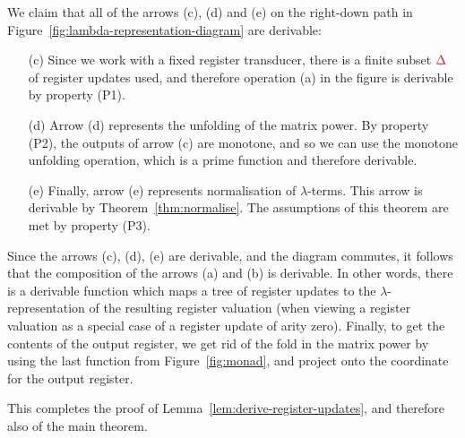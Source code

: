 \pagebreak 
We claim that all of the arrows (c), (d) and (e) on the  right-down path  in  Figure~\ref{fig:lambda-representation-diagram}  are derivable:
\begin{itemize}
    \item[(c)] Since we work with a fixed register transducer, there is a finite subset ${\color{red}{\Delta}}$ of register updates  used, and therefore  operation (a) in the figure is derivable by property (P1).
    \item[(d)] Arrow (d) represents the unfolding of the matrix power. By property (P2), the outputs of arrow (c) are monotone, and so we can use the monotone unfolding operation, which is a  prime function and therefore derivable. 
    \item[(e)] Finally, arrow (e) represents normalisation of $\lambda$-terms. This arrow is derivable by Theorem~\ref{thm:normalise}. The assumptions of this theorem are met by property (P3).
\end{itemize}
Since the arrows (c), (d), (e) are derivable, and the diagram commutes, it follows that  the composition of the arrows (a) and (b) is derivable. In other words, there is a derivable function which maps a tree of register updates to the $\lambda$-representation of the resulting register valuation (when viewing a register valuation as a special case of a register update of arity zero). Finally, to get the contents of the output register, we get rid of the fold in the matrix power by using the last function from Figure~\ref{fig:monad}, and  project onto the coordinate for the output register. 



This completes the proof of Lemma~\ref{lem:derive-register-updates}, and therefore also of the main theorem. 




